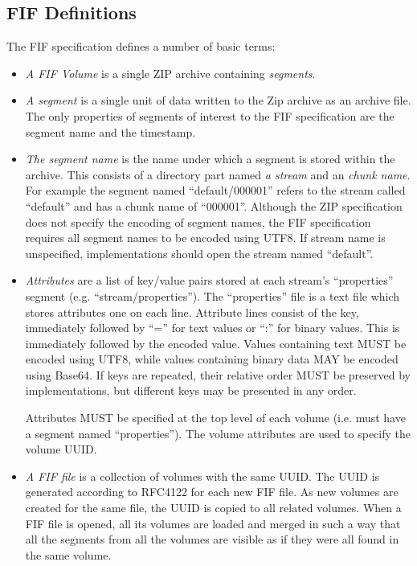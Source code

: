 \documentclass[10pt, conference]{IEEEtran}
\begin{document}
\subsection{FIF Definitions}
The FIF specification defines a number of basic terms:
\begin{itemize}
\item {\em A FIF Volume} is a single ZIP archive containing {\em
segments}.

\item {\em A segment} is a single unit of data written to the Zip
archive as an archive file. The only properties of segments of
interest to the FIF specification are the segment name and the
timestamp.

\item {\em The segment name} is the name under which a segment is
stored within the archive. This consists of a directory part named
{\em a stream} and an {\em chunk name}. For example the segment named
``default/000001'' refers to the stream called ``default'' and has a
chunk name of ``000001''. Although the ZIP specification does not
specify the encoding of segment names, the FIF specification requires
all segment names to be encoded using UTF8. If stream name is
unspecified, implementations should open the stream named ``default''.

\item {\em Attributes} are a list of key/value pairs stored at each
stream's ``properties'' segment (e.g. ``stream/properties''). The
``properties'' file is a text file which stores attributes one on each
line. Attribute lines consist of the key, immediately followed by
``='' for text values or ``:'' for binary values. This is immediately
followed by the encoded value. Values containing text MUST be encoded
using UTF8, while values containing binary data MAY be encoded using
Base64. If keys are repeated, their relative order MUST be preserved
by implementations, but different keys may be presented in any order.

Attributes MUST be specified at the top level of each volume
(i.e. must have a segment named ``properties''). The volume attributes
are used to specify the volume UUID.


\item {\em A FIF file} is a collection of volumes with the same
UUID. The UUID is generated according to RFC4122 for each new FIF
file. As new volumes are created for the same file, the UUID is copied
to all related volumes. When a FIF file is opened, all its volumes are
loaded and merged in such a way that all the segments from all the
volumes are visible as if they were all found in the same volume.

\end{itemize}
\end{document}
